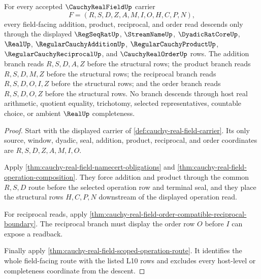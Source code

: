 \begin{theorem}
\label{thm:cauchy-real-field-operation-descent-obligation}
For every accepted $\CauchyRealFieldUp$ carrier
$$
F=(R,S,D,Z,A,M,I,O,H,C,P,N),
$$
every field-facing addition, product, reciprocal, and order read descends only through the displayed $\RegSeqRatUp$, $\StreamNameUp$, $\DyadicRatCoreUp$, $\RealUp$, $\RegularCauchyAdditionUp$, $\RegularCauchyProductUp$, $\RegularCauchyReciprocalUp$, and $\CauchyRealOrderUp$ rows. The addition branch reads $R,S,D,A,Z$ before the structural rows; the product branch reads $R,S,D,M,Z$ before the structural rows; the reciprocal branch reads $R,S,D,O,I,Z$ before the structural rows; and the order branch reads $R,S,D,O,Z$ before the structural rows. No branch descends through host real arithmetic, quotient equality, trichotomy, selected representatives, countable choice, or ambient $\RealUp$ completeness.
\end{theorem}
\begin{proof}
Start with the displayed carrier of \autoref{def:cauchy-real-field-carrier}. Its only source, window, dyadic, seal, addition, product, reciprocal, and order coordinates are $R,S,D,Z,A,M,I,O$.

Apply \autoref{thm:cauchy-real-field-namecert-obligations} and \autoref{thm:cauchy-real-field-operation-composition}. They force addition and product through the common $R,S,D$ route before the selected operation row and terminal seal, and they place the structural rows $H,C,P,N$ downstream of the displayed operation read.

For reciprocal reads, apply \autoref{thm:cauchy-real-field-order-compatible-reciprocal-boundary}. The reciprocal branch must display the order row $O$ before $I$ can expose a readback.

Finally apply \autoref{thm:cauchy-real-field-scoped-operation-route}. It identifies the whole field-facing route with the listed L10 rows and excludes every host-level or completeness coordinate from the descent.
\end{proof}

